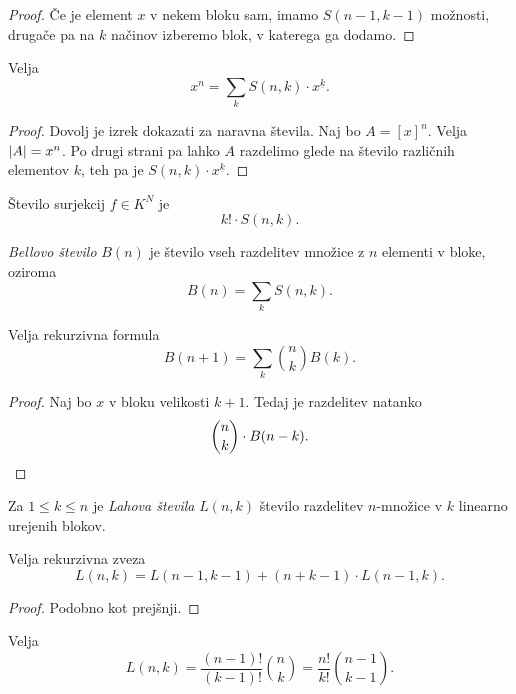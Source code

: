 \begin{proof}
Če je element $x$ v nekem bloku sam, imamo $S(n-1, k-1)$ možnosti,
drugače pa na $k$ načinov izberemo blok, v katerega ga dodamo.
\end{proof}

\begin{izrek}
Velja
\[
x^n = \sum_k S(n, k) \cdot x^{\underline{k}}.
\]
\end{izrek}

\begin{proof}
Dovolj je izrek dokazati za naravna števila. Naj bo $A = [x]^n$.
Velja $\left\lvert A\right\rvert = x^n$. Po drugi strani pa lahko $A$ razdelimo glede
na število različnih elementov $k$, teh pa je
$S(n,k) \cdot x^{\underline{k}}$.
\end{proof}

\begin{trditev}
Število surjekcij $f \in K^N$ je
\[
k! \cdot S(n, k).
\]
\end{trditev}

\obvs

\begin{definicija}
\emph{Bellovo število} $B(n)$ je število
vseh razdelitev množice z $n$ elementi v bloke, oziroma
\[
B(n) = \sum_k S(n, k).
\]
\end{definicija}

\begin{trditev}
Velja rekurzivna formula
\[
B(n+1) = \sum_k \binom{n}{k} B(k).
\]
\end{trditev}

\begin{proof}
Naj bo $x$ v bloku velikosti $k+1$. Tedaj je razdelitev natanko
\[
\binom{n}{k} \cdot B(n-k). \qedhere
\]
\end{proof}

\begin{definicija}
Za $1 \leq k \leq n$ je \emph{Lahova števila}
$L(n, k)$ število razdelitev $n$-množice v $k$ linearno urejenih
blokov.
\end{definicija}

\begin{trditev}
Velja rekurzivna zveza
\[
L(n, k) = L(n-1, k-1) + (n+k-1) \cdot L(n-1, k).
\]
\end{trditev}

\begin{proof}
Podobno kot prejšnji. %
\end{proof}

\begin{izrek}
Velja
\[
L(n, k) =
\frac{(n-1)!}{(k-1)!} \binom{n}{k} =
\frac{n!}{k!} \binom{n-1}{k-1}.
\]
\end{izrek}

